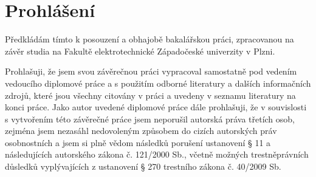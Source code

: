 \chapter*{Prohlášení}
Předkládám tímto k posouzení a obhajobě bakalářskou práci, zpracovanou na závěr studia
na Fakultě elektrotechnické Západočeské univerzity v Plzni.

Prohlašuji, že jsem svou závěrečnou práci vypracoval samostatně pod vedením vedoucího
diplomové práce a s použitím odborné literatury a dalších informačních zdrojů, které
jsou všechny citovány v práci a uvedeny v seznamu literatury na konci práce. Jako autor
uvedené diplomové práce dále prohlašuji, že v souvislosti s vytvořením této závěrečné
práce jsem neporušil autorská práva třetích osob, zejména jsem nezasáhl nedovoleným
způsobem do cizích autorských práv osobnostních a jsem si plně vědom následků porušení
ustanovení § 11 a následujících autorského zákona č. 121/2000 Sb., včetně možných
trestněprávních důsledků vyplývajících z ustanovení § 270 trestního zákona č. 40/2009 Sb.